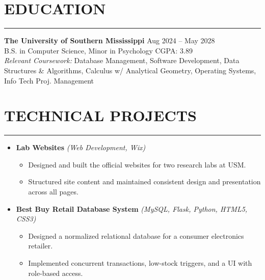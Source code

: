 \documentclass[10pt, letterpaper]{article}
\newcommand{\ghlink}[1]{\href{#1}{\color{bluecolor}\faIcon{github}}}
\newcommand{\urllink}[1]{\href{#1}{\color{bluecolor}\faIcon{link}}}
\begin{document}
\begin{minipage}[t]{0.72\textwidth}
\vspace{0pt}

\section*{EDUCATION}\vspace{-2pt}\hrule\vspace{6pt}
\textbf{The University of Southern Mississippi} \hfill Aug 2024 -- May 2028\\
B.S. in Computer Science, Minor in Psychology \hfill CGPA: 3.89\\
\textit{Relevant Coursework:} Database Management, Software Development, Data Structures \& Algorithms, Calculus w/ Analytical Geometry, Operating Systems, Info Tech Proj. Management

\vspace{6pt}

\section*{TECHNICAL PROJECTS}\vspace{-2pt}\hrule\vspace{6pt}
\begin{itemize}[label=\raisebox{0.25ex}{\rule{0.65ex}{0.65ex}}]

    \item \textbf{Lab Websites} \textit{(Web Development, Wix)} \hfill
        \urllink{https://virtualrealitylabusm.wixsite.com/virtual-reality-lab} \textbar{} \urllink{https://psychologylabusm.wixsite.com/experimental-health}
    \begin{itemize}[label=--, nosep]
        \item Designed and built the official websites for two research labs at USM.
        \item Structured site content and maintained consistent design and presentation across all pages.
    \end{itemize}

    \vspace{7pt}

    \item \textbf{Best Buy Retail Database System} \textit{(MySQL, Flask, Python, HTML5, CSS3)} \hfill
        \ghlink{https://github.com/MdSafwanBinRashid/Retailer_Enterprise_Database_System_BestBuyModel/tree/main}
    \begin{itemize}[label=--, nosep]
        \item Designed a normalized relational database for a consumer electronics retailer.
        \item Implemented concurrent transactions, low-stock triggers, and a UI with role-based access.
    \end{itemize}


\end{itemize}
\end{minipage}
\end{document}
